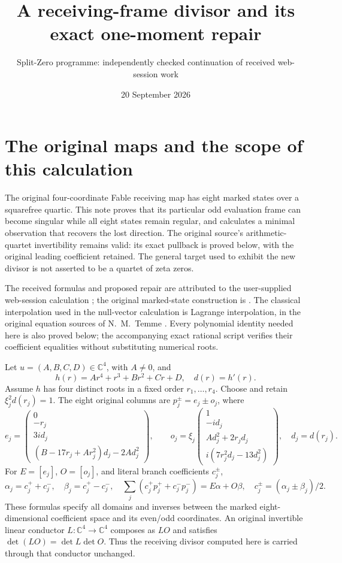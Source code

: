 \documentclass[11pt]{article}
\title{A receiving-frame divisor and its exact one-moment repair}
\author{Split-Zero programme: independently checked continuation of received web-session work}
\date{20 September 2026}
\newcommand{\C}{\mathbb C}
\begin{document}
\maketitle

\section{The original maps and the scope of this calculation}
The original four-coordinate Fable receiving map has eight marked states
over a squarefree quartic. This note proves that its particular odd
evaluation frame can become singular while all eight states remain
regular, and calculates a minimal observation that recovers the lost
direction. The original source's arithmetic-quartet invertibility
remains valid: its exact pullback is proved below, with the original
leading coefficient retained. The general target used to exhibit the
new divisor is not asserted to be a quartet of zeta zeros.

The received formulas and proposed repair are attributed to the
user-supplied web-session calculation \cite{Incoming}; the original
marked-state construction is \cite[SE1--14, GF20--21]{Fable}.
The classical interpolation used in the null-vector calculation is
Lagrange interpolation, in the original equation sources of
N.~M.~Temme \cite{Temme}. Every polynomial identity needed here is
also proved below; the accompanying exact rational script verifies
their coefficient equalities without substituting numerical roots.

Let $u=(A,B,C,D)\in\C^4$, with $A\ne0$, and
\begin{equation}
 h(r)=Ar^4+r^3+Br^2+Cr+D,\quad d(r)=h'(r).
 \tag{OF1}
\end{equation}
Assume $h$ has four distinct roots in a fixed order $r_1,\ldots,r_4$.
Choose and retain $\xi_j^2d(r_j)=1$. The eight original columns are
$p_j^\pm=e_j\pm o_j$, where
\begin{equation}
 e_j=\begin{pmatrix}0\\-r_j\\3i d_j\\
 (B-17r_j+Ar_j^2)d_j-2Ad_j^2\end{pmatrix},\qquad
 o_j=\xi_j\begin{pmatrix}1\\-id_j\\Ad_j^2+2r_jd_j\\
 i(7r_j^2d_j-13d_j^2)\end{pmatrix},\quad d_j=d(r_j).
 \tag{OF2}
\end{equation}
For $E=[e_j]$, $O=[o_j]$, and literal branch coefficients $c_j^\pm$,
\begin{equation}
 \alpha_j=c_j^++c_j^-,\quad\beta_j=c_j^+-c_j^-,\quad
 \sum_j(c_j^+p_j^++c_j^-p_j^-)=E\alpha+O\beta,\quad
 c_j^\pm=(\alpha_j\pm\beta_j)/2.\tag{OF3}
\end{equation}
These formulas specify all domains and inverses between the marked
eight-dimensional coefficient space and its even/odd coordinates.
An original invertible linear conductor $L:\C^4\to\C^4$ composes
as $LO$ and satisfies $\det(LO)=\det L\det O$. Thus the receiving
divisor computed here is carried through that conductor unchanged.
\end{document}
